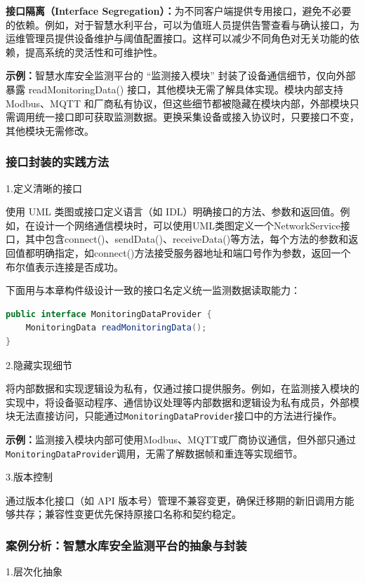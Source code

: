 \textbf{接口隔离（Interface Segregation）：}为不同客户端提供专用接口，避免不必要的依赖。例如，对于智慧水利平台，可以为值班人员提供告警查看与确认接口，为运维管理员提供设备维护与阈值配置接口。这样可以减少不同角色对无关功能的依赖，提高系统的灵活性和可维护性。

\textbf{示例：}智慧水库安全监测平台的 “监测接入模块” 封装了设备通信细节，仅向外部暴露 readMonitoringData() 接口，其他模块无需了解具体实现。模块内部支持 Modbus、MQTT 和厂商私有协议，但这些细节都被隐藏在模块内部，外部模块只需调用统一接口即可获取监测数据。更换采集设备或接入协议时，只要接口不变，其他模块无需修改。

\subsubsection{接口封装的实践方法}
1.定义清晰的接口

使用 UML 类图或接口定义语言（如 IDL）明确接口的方法、参数和返回值。例如，在设计一个网络通信模块时，可以使用UML类图定义一个NetworkService接口，其中包含connect()、sendData()、receiveData()等方法，每个方法的参数和返回值都明确指定，如connect()方法接受服务器地址和端口号作为参数，返回一个布尔值表示连接是否成功。

下面用与本章构件级设计一致的接口名定义统一监测数据读取能力：

\begin{lstlisting}[language=Java]
public interface MonitoringDataProvider {
    MonitoringData readMonitoringData();
}
\end{lstlisting}

2.隐藏实现细节

将内部数据和实现逻辑设为私有，仅通过接口提供服务。例如，在监测接入模块的实现中，将设备驱动程序、通信协议处理等内部数据和逻辑设为私有成员，外部模块无法直接访问，只能通过\texttt{MonitoringDataProvider}接口中的方法进行操作。

\textbf{示例：}监测接入模块内部可使用Modbus、MQTT或厂商协议通信，但外部只通过\texttt{MonitoringDataProvider}调用，无需了解数据帧和重连等实现细节。

3.版本控制

通过版本化接口（如 API 版本号）管理不兼容变更，确保迁移期的新旧调用方能够共存；兼容性变更优先保持原接口名称和契约稳定。

\subsubsection{案例分析：智慧水库安全监测平台的抽象与封装}
1.层次化抽象

